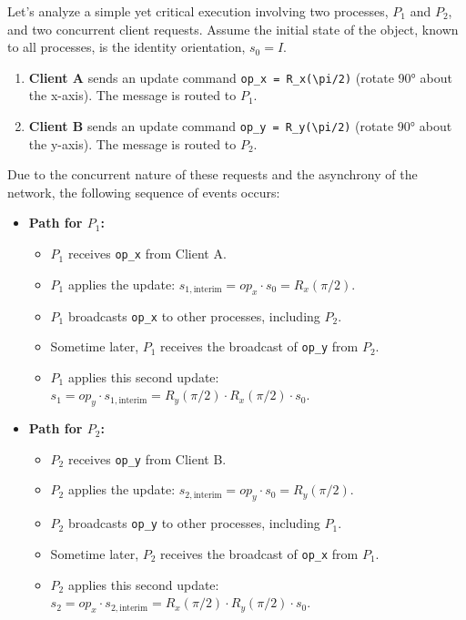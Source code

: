 \documentclass[
]{article}
\providecommand{\tightlist}{%
  \setlength{\itemsep}{0pt}\setlength{\parskip}{0pt}}
\begin{document}
Let's analyze a simple yet critical execution involving two processes,
\(P_1\) and \(P_2\), and two concurrent client requests. Assume the
initial state of the object, known to all processes, is the identity
orientation, \(s_0 = I\).

\begin{enumerate}
\def\labelenumi{\arabic{enumi}.}
\tightlist
\item
  \textbf{Client A} sends an update command
  \texttt{op\_x\ =\ R\_x(\textbackslash{}pi/2)} (rotate 90° about the
  x-axis). The message is routed to \(P_1\).
\item
  \textbf{Client B} sends an update command
  \texttt{op\_y\ =\ R\_y(\textbackslash{}pi/2)} (rotate 90° about the
  y-axis). The message is routed to \(P_2\).
\end{enumerate}

Due to the concurrent nature of these requests and the asynchrony of the
network, the following sequence of events occurs:

\begin{itemize}
\tightlist
\item
  \textbf{Path for \(P_1\):}

  \begin{itemize}
  \tightlist
  \item
    \(P_1\) receives \texttt{op\_x} from Client A.
  \item
    \(P_1\) applies the update:
    \(s_{1, \text{interim}} = op_x \cdot s_0 = R_x(\pi/2)\).
  \item
    \(P_1\) broadcasts \texttt{op\_x} to other processes, including
    \(P_2\).
  \item
    Sometime later, \(P_1\) receives the broadcast of \texttt{op\_y}
    from \(P_2\).
  \item
    \(P_1\) applies this second update:
    \(s_1 = op_y \cdot s_{1, \text{interim}} = R_y(\pi/2) \cdot R_x(\pi/2) \cdot s_0\).
  \end{itemize}
\item
  \textbf{Path for \(P_2\):}

  \begin{itemize}
  \tightlist
  \item
    \(P_2\) receives \texttt{op\_y} from Client B.
  \item
    \(P_2\) applies the update:
    \(s_{2, \text{interim}} = op_y \cdot s_0 = R_y(\pi/2)\).
  \item
    \(P_2\) broadcasts \texttt{op\_y} to other processes, including
    \(P_1\).
  \item
    Sometime later, \(P_2\) receives the broadcast of \texttt{op\_x}
    from \(P_1\).
  \item
    \(P_2\) applies this second update:
    \(s_2 = op_x \cdot s_{2, \text{interim}} = R_x(\pi/2) \cdot R_y(\pi/2) \cdot s_0\).
  \end{itemize}
\end{itemize}
\end{document}
